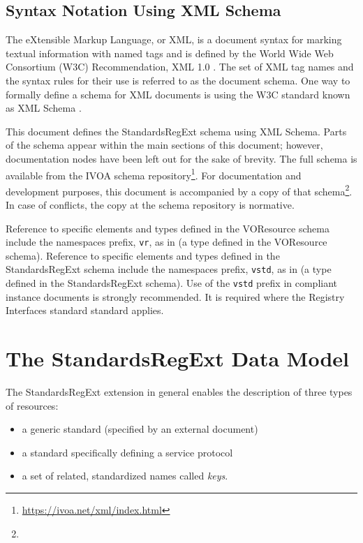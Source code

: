 \documentclass[11pt,a4paper]{ivoa}
\begin{document}
\subsection{Syntax Notation Using XML Schema}
The eXtensible Markup Language, or XML, is a document syntax for marking
textual information with named tags and is defined by the
World Wide Web Consortium (W3C) Recommendation,
XML 1.0 \citep{std:XML}.
The set of XML tag names and the syntax
rules for their use is referred to as the document schema.  One way to
formally define a schema for XML documents is using the W3C standard
known as XML Schema \citep{std:XSD}.


This document defines the StandardsRegExt schema using XML Schema.
Parts of the schema appear within the main sections of this document;
however, documentation nodes have been left out for the sake of brevity.
The full schema is available from the IVOA schema
repository\footnote{\url{https://ivoa.net/xml/index.html}}.  For
documentation and development purposes, this document is accompanied by
a copy of that
schema\footnote{}.  In case of
conflicts, the copy at the schema repository is normative.

Reference to specific elements and types defined in the VOResource
schema include the namespaces prefix, \texttt{vr}, as in
 (a type defined in the VOResource schema).
Reference to specific elements and types defined in the StandardsRegExt
schema include the namespaces prefix, \texttt{vstd}, as in
 (a type defined in the StandardsRegExt schema).
Use of the \texttt{vstd} prefix in compliant instance documents is 
strongly recommended.  It is required where the Registry Interfaces
standard \citep{2018ivoa.spec.0723D} standard applies.




\section{The StandardsRegExt Data Model}

The StandardsRegExt extension in general enables the description of three
types of resources:

\begin{itemize}
\item  a generic standard (specified by an external document)
\item  a standard specifically defining a service protocol
\item  a set of related, standardized names called \emph{keys}.
\end{itemize}
\end{document}
